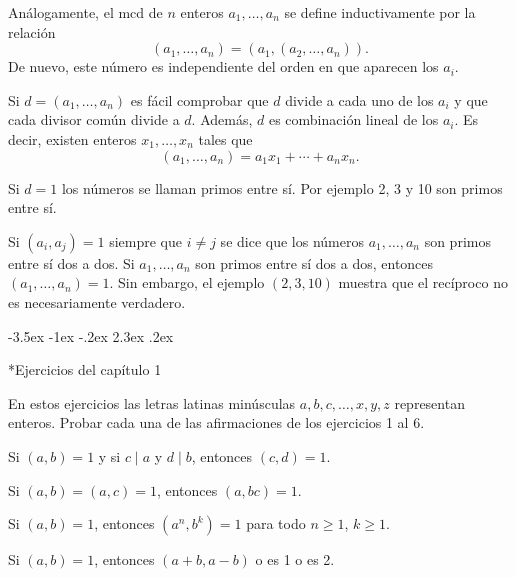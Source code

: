 \documentclass[12pt,a4paper]{book}
\makeatletter
\renewcommand\section{\@startsection{section}{1}{\z@}%
  {-3.5ex \@plus -1ex \@minus -.2ex}%
  {2.3ex \@plus .2ex}%
  {\normalfont\Large\bfseries\raggedright}}
\makeatother
\begin{document}
    Análogamente, el mcd de $n$ enteros $a_{1},\dots,a_{n}$ se define inductivamente por la
    relación
    \begin{equation*}
        (a_{1},\dots,a_{n})=(a_{1},(a_{2},\dots,a_{n})).
    \end{equation*}
    De nuevo, este número es independiente del orden en que aparecen los $a_{i}$.

    Si $d=(a_{1},\dots,a_{n})$ es fácil comprobar que $d$ divide a cada uno de los $a_{i}$ y que
    cada divisor común divide a $d$. Además, $d$ es combinación lineal de los $a_{i}$. Es
    decir, existen enteros $x_{1},\dots,x_{n}$ tales que
    \begin{equation*}
        (a_{1},\dots,a_{n})=a_{1}x_{1}+\cdots+a_{n}x_{n}.
    \end{equation*}

    Si $d=1$ los números se llaman primos entre sí. Por ejemplo 2, 3 y 10 son primos entre sí.

    Si $(a_{i},a_{j})=1$ siempre que $i\neq j$ se dice que los números $a_{1},\dots,a_{n}$ son primos
    entre sí dos a dos. Si $a_{1},\dots,a_{n}$ son primos entre sí dos a dos, entonces
    $(a_{1},\dots,a_{n})=1$. Sin embargo, el ejemplo $(2,3,10)$ muestra que el recíproco no es
    necesariamente verdadero.

    \section*{Ejercicios del capítulo 1}

    En estos ejercicios las letras latinas minúsculas $a,b,c,\dots,x,y,z$ representan
    enteros. Probar cada una de las afirmaciones de los ejercicios 1 al 6.

    \begin{ejercicio}
        Si $(a,b)=1$ y si $c\mid a$ y $d\mid b$, entonces $(c,d)=1$.
    \end{ejercicio}

    \begin{ejercicio}
        Si $(a,b)=(a,c)=1$, entonces $(a,bc)=1$.
    \end{ejercicio}

    \begin{ejercicio}
        Si $(a,b)=1$, entonces $(a^{n},b^{k})=1$ para todo $n\geq1$, $k\geq1$.
    \end{ejercicio}

    \begin{ejercicio}
        Si $(a,b)=1$, entonces $(a+b,a-b)$ o es 1 o es 2.
    \end{ejercicio}
\end{document}
